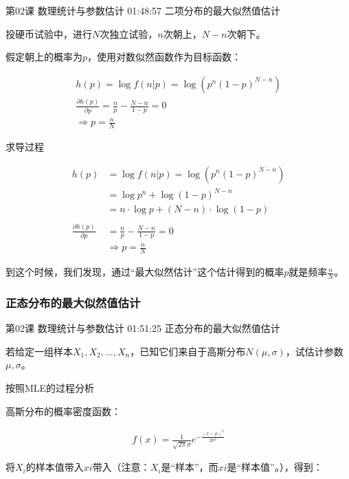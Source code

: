 \documentclass[UTF8]{ctexart}
\begin{document}
第02课 数理统计与参数估计 01:48:57 二项分布的最大似然值估计

投硬币试验中，进行$N$次独立试验，$n$次朝上，$N-n$次朝下。

假定朝上的概率为$p$，使用对数似然函数作为目标函数：

\begin{equation}
\begin{aligned}
h(p)=\log f(n|p)=\log (p^{n}(1-p)^{N-n}) \\
\frac{\partial h(p)}{\partial p}=\frac{n}{p} - \frac{N-n}{1-p} = 0 \\
\Rightarrow p = \frac{n}{N}
\end{aligned}
\end{equation}

求导过程

\begin{equation}
\begin{aligned}
h(p)&=\log f(n|p)=\log (p^{n}(1-p)^{N-n}) \\
&=\log p^{n} + \log (1-p)^{N-n} \\
&= n \cdot \log p + (N-n) \cdot \log (1-p) \\ \\
\frac{\partial h(p)}{\partial p}&=\frac{n}{p} - \frac{N-n}{1-p} = 0 \\
& \Rightarrow p = \frac{n}{N}
\end{aligned}
\end{equation}

到这个时候，我们发现，通过“最大似然估计”这个估计得到的概率$p$就是频率$\frac{n}{N}$。

\subsubsection{正态分布的最大似然值估计}

第02课 数理统计与参数估计 01:51:25 正态分布的最大似然值估计

若给定一组样本$X_ {1},X_{2},\dots,X_{n}$，已知它们来自于高斯分布$N(\mu,\sigma)$，试估计参数$\mu,\sigma$。

按照MLE的过程分析

高斯分布的概率密度函数：

\begin{equation}
\begin{aligned}
f(x)=\frac{1}{\sqrt{2\pi}\sigma} e ^{-\frac{(x-\mu)^{2}}{2\sigma^{2}}}
\end{aligned}
\end{equation}

将$X_{i}$的样本值带入$x{i}$带入（注意：$X_{i}$是“样本”，而$x{i}$是“样本值”。），得到：
\end{document}
